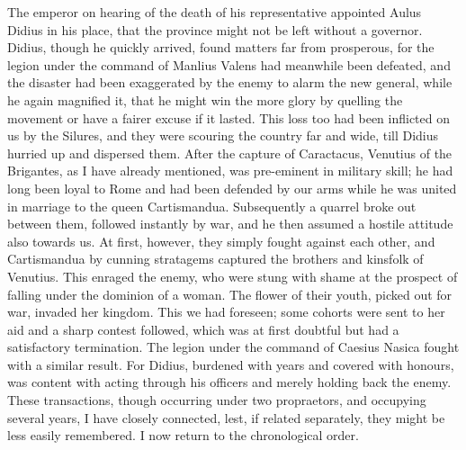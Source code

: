 The emperor on hearing of the death of his representative appointed Aulus Didius in his place, that the province might not be left without a governor. Didius, though he quickly arrived, found matters far from prosperous, for the legion under the command of Manlius Valens had meanwhile been defeated, and the disaster had been exaggerated by the enemy to alarm the new general, while he again magnified it, that he might win the more glory by quelling the movement or have a fairer excuse if it lasted. This loss too had been inflicted on us by the Silures, and they were scouring the country far and wide, till Didius hurried up and dispersed them. After the capture of Caractacus, Venutius of the Brigantes, as I have already mentioned, was pre-eminent in military skill; he had long been loyal to Rome and had been defended by our arms while he was united in marriage to the queen Cartismandua. Subsequently a quarrel broke out between them, followed instantly by war, and he then assumed a hostile attitude also towards us. At first, however, they simply fought against each other, and Cartismandua by cunning stratagems captured the brothers and kinsfolk of Venutius. This enraged the enemy, who were stung with shame at the prospect of falling under the dominion of a woman. The flower of their youth, picked out for war, invaded her kingdom. This we had foreseen; some cohorts were sent to her aid and a sharp contest followed, which was at first doubtful but had a satisfactory termination. The legion under the command of Caesius Nasica fought with a similar result. For Didius, burdened with years and covered with honours, was content with acting through his officers and merely holding back the enemy. These transactions, though occurring under two propraetors, and occupying several years, I have closely connected, lest, if related separately, they might be less easily remembered. I now return to the chronological order.


